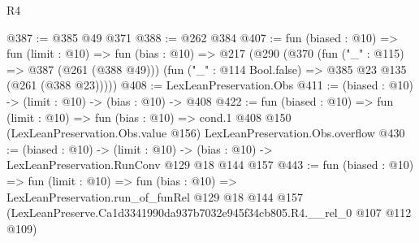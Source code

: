 \begin{lexlean}{R4}
\begin{coremodule}
@387 := @385 @49 @371
@388 := @262 @384
@407 := fun (biased : @10) =>
  fun (limit : @10) =>
  fun (bias : @10) =>
  @217
    (@290
      (@370
        (fun ("_" : @115) => @387 (@261 (@388 @49)))
        (fun ("_" : @114 Bool.false) => @385 @23 @135 (@261 (@388 @23)))))
@408 := LexLeanPreservation.Obs
@411 := (biased : @10) -> (limit : @10) -> (bias : @10) -> @408
@422 := fun (biased : @10) =>
  fun (limit : @10) =>
  fun (bias : @10) =>
  cond.{1} @408 @150 (LexLeanPreservation.Obs.value @156) LexLeanPreservation.Obs.overflow
@430 := (biased : @10) ->
  (limit : @10) -> (bias : @10) -> LexLeanPreservation.RunConv @129 @18 @144 @157
@443 := fun (biased : @10) =>
  fun (limit : @10) =>
  fun (bias : @10) =>
  LexLeanPreservation.run_of_funRel
    @129
    @18
    @144
    @157
    (LexLeanPreserve.Ca1d3341990da937b7032e945f34cb805.R4.__rel_0 @107 @112 @109)
\end{coremodule}
\end{lexlean}
